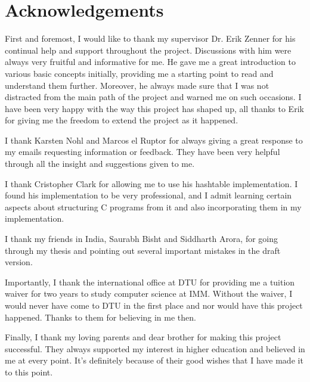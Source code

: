 
\chapter*{Acknowledgements}

First and foremost, I would like to thank my supervisor Dr. Erik Zenner for his continual help and support throughout the project. Discussions with him were always very fruitful and informative for me. He gave me a great introduction to various basic concepts initially, providing me a starting point to read and understand them further. Moreover, he always made sure that I was not distracted from the main path of the project and warned me on such occasions. I have been very happy with the way this project has shaped up, all thanks to Erik for giving me the freedom to extend the project as it happened. 

I thank Karsten Nohl and Marcos el Ruptor for always giving a great response to my emails requesting information or feedback. They have been very helpful through all the insight and suggestions given to me. 

I thank Cristopher Clark for allowing me to use his hashtable implementation. I found his implementation to be very professional, and I admit learning certain aspects about structuring C programs from it and also incorporating them in my implementation. 

I thank my friends in India, Saurabh Bisht and Siddharth Arora, for going through my thesis and pointing out several important mistakes in the draft version.

Importantly, I thank the international office at DTU for providing me a tuition waiver for two years to study computer science at IMM. Without the waiver, I would never have come to DTU in the first place and nor would have this project happened. Thanks to them for believing in me then.

Finally, I thank my loving parents and dear brother for making this project successful. They always supported my interest in higher education and believed in me at every point. It's definitely because of their good wishes that I have made it to this point. 